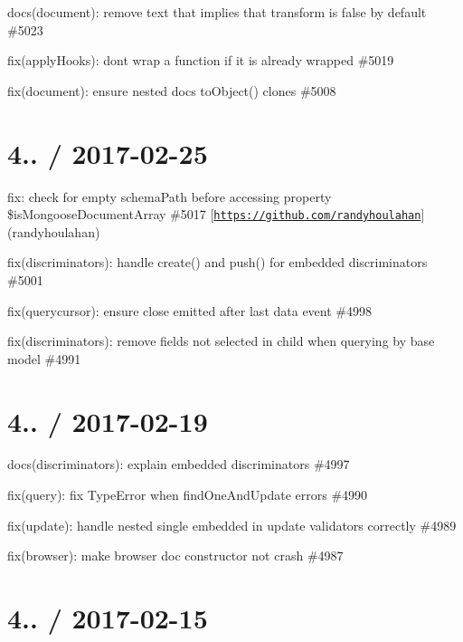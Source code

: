 \begin{DoxyItemize}
\item docs(document)\+: remove text that implies that transform is false by default \#5023
\item fix(apply\+Hooks)\+: dont wrap a function if it is already wrapped \#5019
\item fix(document)\+: ensure nested docs\textquotesingle{} to\+Object() clones \#5008
\end{DoxyItemize}

\section*{4.. / 2017-\/02-\/25 }


\begin{DoxyItemize}
\item fix\+: check for empty schema\+Path before accessing property \$is\+Mongoose\+Document\+Array \#5017 \mbox{[}\href{https://github.com/randyhoulahan}{\tt https\+://github.\+com/randyhoulahan}\mbox{]}(randyhoulahan)
\item fix(discriminators)\+: handle create() and push() for embedded discriminators \#5001
\item fix(querycursor)\+: ensure close emitted after last data event \#4998
\item fix(discriminators)\+: remove fields not selected in child when querying by base model \#4991
\end{DoxyItemize}

\section*{4.. / 2017-\/02-\/19 }


\begin{DoxyItemize}
\item docs(discriminators)\+: explain embedded discriminators \#4997
\item fix(query)\+: fix Type\+Error when find\+One\+And\+Update errors \#4990
\item fix(update)\+: handle nested single embedded in update validators correctly \#4989
\item fix(browser)\+: make browser doc constructor not crash \#4987
\end{DoxyItemize}

\section*{4.. / 2017-\/02-\/15 }


